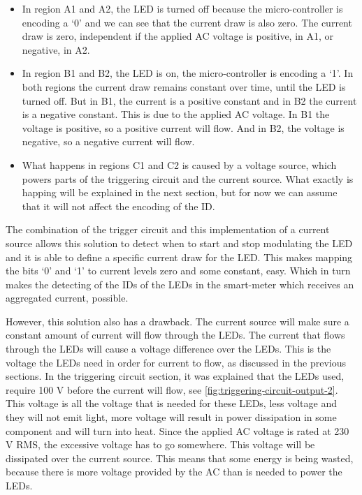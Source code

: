 	\begin{itemize}

		\item In region A1 and A2, the LED is turned off because the micro-controller is encoding a `0' and we can see that the current draw is also zero.
		The current draw is zero, independent if the applied AC voltage is positive, in A1, or negative, in A2.


		\item In region B1 and B2, the LED is on, the micro-controller is encoding a `1'. 
		In both regions the current draw remains constant over time, until the LED is turned off.
		But in B1, the current is a positive constant and in B2 the current is a negative constant.
		This is due to the applied AC voltage.
		In B1 the voltage is positive, so a positive current will flow.
		And in B2, the voltage is negative, so a negative current will flow.

		\item What happens in regions C1 and C2 is caused by a voltage source, which powers parts of the triggering circuit and the current source.
		What exactly is happing will be explained in the next section, but for now we can assume that it will not affect the encoding of the ID.

	\end{itemize}




	The combination of the trigger circuit and this implementation of a current source allows this solution to detect when to start and stop modulating the LED and it is able to define a specific current draw for the LED.
	This makes mapping the bits `0' and `1' to current levels zero and some constant, easy.
	Which in turn makes the detecting of the IDs of the LEDs in the smart-meter which receives an aggregated current, possible.

	






	However, this solution also has a drawback.
	The current source will make sure a constant amount of current will flow through the LEDs.
	The current that flows through the LEDs will cause a voltage difference over the LEDs.
	This is the voltage the LEDs need in order for current to flow, as discussed in the previous sections.
	In the triggering circuit section, it was explained that the LEDs used, require 100 V before the current will flow, see \autoref{fig:triggering-circuit-output-2}.
	This voltage is all the voltage that is needed for these LEDs, less voltage and they will not emit light, more voltage will result in power dissipation in some component and will turn into heat.
	Since the applied AC voltage is rated at 230 V RMS, the excessive voltage has to go somewhere.
	This voltage will be dissipated over the current source.
	This means that some energy is being wasted, because there is more voltage provided by the AC than is needed to power the LEDs.



